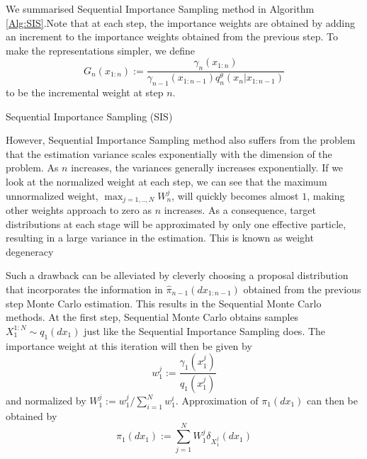 \documentclass[12pt,a4paper]{article}
\begin{document}
We summarised Sequential Importance Sampling method in Algorithm \ref{Alg:SIS}.Note that at each step, the importance weights are obtained by adding an increment to the importance weights obtained from the previous step. To make the representations simpler, we define 
$$G_n(x_{1:n}) := \frac{\gamma_n(x_{1:n})}{\gamma_{n-1}(x_{1:n-1})q_n^{\theta}(x_n|x_{1:n-1})}$$
to be the incremental weight at step $n$.
\begin{algorithm}[ht]
    \caption{Sequential Importance Sampling (SIS)}\label{Alg:SIS}
    \end{algorithm}

However, Sequential Importance Sampling method also suffers from the problem that the estimation variance scales exponentially with the dimension of the problem. As $n$ increases, the variances generally increases exponentially. If we look at the normalized weight at each step, we can see that the maximum unnormalized weight, $\max_{j=1,..,N} W_n^j$, will quickly becomes almost $1$, making other weights approach to zero as $n$ increases. As a consequence, target distributions at each stage will be approximated by only one effective particle, resulting in a large variance in the estimation. This is known as weight degeneracy 

Such a drawback can be alleviated by cleverly choosing a proposal distribution that incorporates the information in $\hat{\pi}_{n-1}(dx_{1:n-1})$ obtained from the previous step Monte Carlo estimation. This results in the Sequential Monte Carlo methods. At the first step, Sequential Monte Carlo obtains samples $X_1^{1:N} \sim q_1(dx_1)$ just like the Sequential Importance Sampling does. The importance weight at this iteration will then be given by 
\begin{equation}
    \label{SMC-1ST Iter Importance Weight}
    w_{1}^j := \frac{\gamma_{1}\left(x_1^j\right)}{q_1\left(x_1^j\right)}
\end{equation}
and normalized by $W_1^j := w_1^j / \sum_{i=1}^N w_1^i$. Approximation of $\pi_1(dx_1)$ can then be obtained by 
\begin{equation}
    \label{SMC - pi1}
    \hat{\pi}_1\left(dx_1\right) := \sum_{j=1}^{N} W_1^j \delta_{X_1^j} \left(dx_1\right)
\end{equation}
\end{document}
